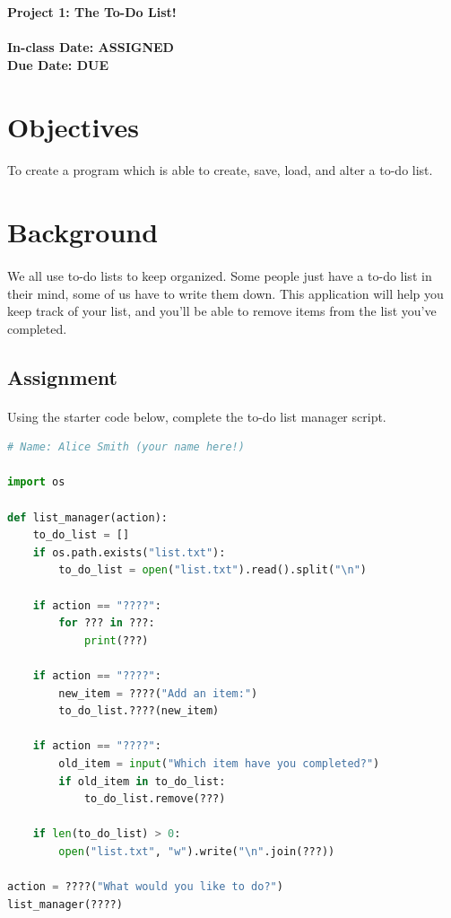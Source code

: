 \documentclass[letter,10pt]{article}
\begin{document}
    
    \huge
    \textbf{Project 1: The To-Do List!}
    \normalsize
    \\ ~~ \\
    \textbf{In-class Date: ASSIGNED} \\
    \textbf{Due Date: DUE}
    
    \section*{Objectives}
    \paragraph{}To create a program which is able to create, save, load, and alter a to-do list.
    
    \section*{Background}
    \paragraph{}We all use to-do lists to keep organized. Some people just have a to-do list in their mind, some of us have to write them down. This application will help you keep track of your list, and you'll be able to remove items from the list you've completed.
    
    \subsection*{Assignment}
    \paragraph{}Using the starter code below, complete the to-do list manager script.
    
    \begin{lstlisting}[language=python]
# Name: Alice Smith (your name here!)

import os

def list_manager(action):
    to_do_list = []
    if os.path.exists("list.txt"):
        to_do_list = open("list.txt").read().split("\n")
    
    if action == "????":
        for ??? in ???:
            print(???)
    
    if action == "????":
        new_item = ????("Add an item:")
        to_do_list.????(new_item)
    
    if action == "????":
        old_item = input("Which item have you completed?")
        if old_item in to_do_list:
            to_do_list.remove(???)
    
    if len(to_do_list) > 0:
        open("list.txt", "w").write("\n".join(???))
    
action = ????("What would you like to do?")
list_manager(????)
    \end{lstlisting}
    
\end{document}
